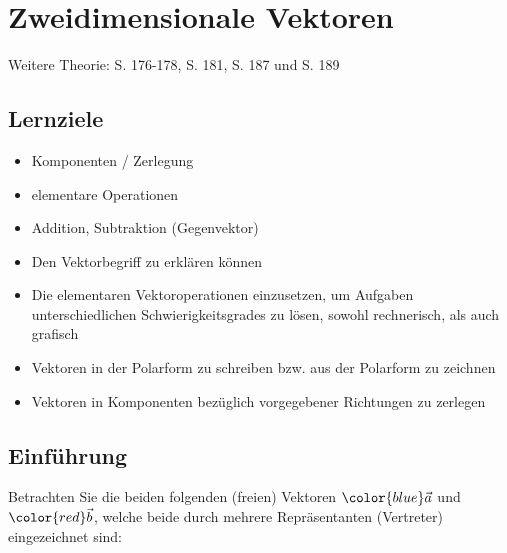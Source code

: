 
\section{Zweidimensionale Vektoren}

Weitere Theorie: S. 176-178, S. 181, S. 187 und S. 189

\subsection*{Lernziele}
\begin{itemize}
\item Komponenten / Zerlegung
\item elementare Operationen
\item Addition, Subtraktion (Gegenvektor)
\item Den Vektorbegriff zu erklären können
\item Die elementaren Vektoroperationen einzusetzen, um Aufgaben
  unterschiedlichen Schwierigkeitsgrades zu lösen, sowohl rechnerisch,
  als auch grafisch
\item Vektoren in der Polarform zu schreiben bzw. aus der Polarform zu zeichnen
\item Vektoren in Komponenten bezüglich vorgegebener Richtungen zu zerlegen
\end{itemize}
\newpage

\subsection{Einführung}

Betrachten Sie die beiden folgenden (freien) Vektoren ${\color{blue} \vec{a}}$ und
${\color{red}\vec{b}}$, welche beide durch mehrere Repräsentanten
(Vertreter) eingezeichnet sind:


